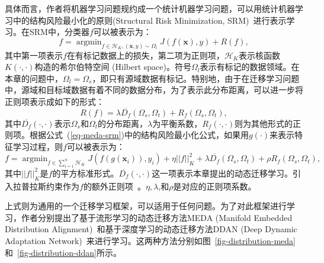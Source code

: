 具体而言，作者将机器学习问题规约成一个统计机器学习问题，可以用统计机器学习中的结构风险最小化的原则(Structural Risk Minimization, SRM)~\cite{belkin2006manifold,vapnik1998statistical}进行表示学习。在SRM中，分类器$f$可以被表示为：
\begin{equation}
\label{eq-meda-srm}
f = \mathop{\arg\min}_{f \in \mathcal{H}_{K}, (\mathbf{x},y) \sim \Omega_l} J(f(\mathbf{x}),y) + R(f),
\end{equation}
其中第一项表示$f$在有标记数据上的损失，第二项为正则项，$\mathcal{H}_{K}$表示核函数$K(\cdot,\cdot)$构造的希尔伯特空间 (Hilbert space)。符号$\Omega_l$表示有标记的数据领域。在本章的问题中，$\Omega_l = \Omega_s$，即只有源域数据有标记。特别地，由于在迁移学习问题中，源域和目标域数据有着不同的数据分布，为了表示此分布距离，可以进一步将正则项表示成如下的形式：
\begin{equation}
R(f) = \lambda \overline{D_f}(\Omega_s,\Omega_t) + R_f(\Omega_s,\Omega_t),
\end{equation}
其中$\overline{D_f}(\cdot, \cdot)$表示$\Omega_s$和$\Omega_t$的分布距离，$\lambda$为平衡系数，$R_f(\cdot, \cdot)$则为其他形式的正则项。根据公式~(\ref{eq-meda-srm})中的结构风险最小化公式，如果用$g(\cdot)$来表示特征学习过程，则$f$可以被表示为：
\begin{equation}
\label{equ-f-orig}
f = \mathop{\arg\min}_{f \in \sum_{i=1}^{n} \mathcal{H}_{K}} J(f(g(\mathbf{x}_i)),y_i) + \eta ||f||^2_K + \lambda \overline{D_f}(\Omega_s,\Omega_t) + \rho R_f(\Omega_s,\Omega_t),
\end{equation}
其中$||f||^2_K$是$f$的平方标准形式。$\overline{D_f}(\cdot,\cdot)$这一项表示本章提出的动态迁移学习。引入拉普拉斯约束作为$f$的额外正则项~\cite{belkin2006manifold}。$\eta,\lambda$,和$\rho$是对应的正则项系数。

上式则为通用的一个迁移学习框架，可以适用于任何问题。为了对此框架进行学习，作者分别提出了基于流形学习的动态迁移方法MEDA (Manifold Embedded Distribution Alignment)~\cite{wang2018visual}和基于深度学习的动态迁移方法DDAN (Deep Dynamic Adaptation Network)~\cite{wang2019transfer}来进行学习。这两种方法分别如图~\ref{fig-distribution-meda}和~\ref{fig-distribution-ddan}所示。

%	
%	

